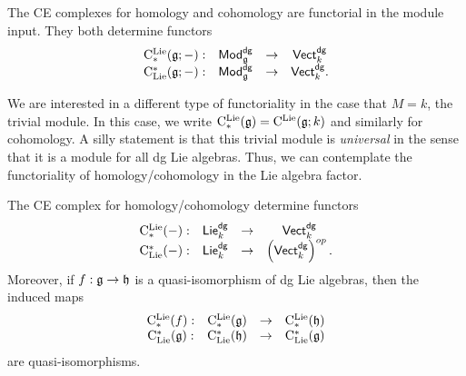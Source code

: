 \documentclass[11pt]{amsart}
\def\dgVect{{\sf Vect}^{\sf dg}}
\def\dgLie{{\sf Lie}^{\sf dg}}
\def\dgMod{{\sf Mod}^{\sf dg}}
\begin{document}
\subsubsection{}

The CE complexes for homology and cohomology are functorial in the module input.
They both determine functors
\[
\begin{array}{cccc}
\clieu_*(\fg ; -) : & \dgMod_\fg & \to & \dgVect_k\\
\clie^*(\fg ; -) : & \dgMod_{\fg} & \to & \dgVect_k .
\end{array}
\]

We are interested in a different type of functoriality in the case that $M = k$, the trivial module. 
In this case, we write ${\rm C}^{\rm Lie}_*(\mathfrak g) = {\rm C}^{\rm Lie}(\mathfrak g;k)$ and similarly for cohomology.
A silly statement is that this trivial module is {\em universal} in the sense that it is a module for all dg Lie algebras.
Thus, we can contemplate the functoriality of homology/cohomology in the Lie algebra factor. 

\begin{lem}
The CE complex for homology/cohomology determine functors
\[
\begin{array}{cccc}
\clieu_*(-) : & \dgLie_k & \to & \dgVect_k\\
\clie^*(-) : & \dgLie_k & \to & \left(\dgVect_k\right)^{op} .
\end{array}
\]
Moreover, if $f : \mathfrak g \to \mathfrak h$ is a quasi-isomorphism of dg Lie algebras, then the induced maps
\[
\begin{array}{cccc}
{\rm C}^{\rm Lie}_*(f) : & {\rm C}^{\rm Lie}_*(\mathfrak g) & \to & {\rm C}^{\rm Lie}_*(\mathfrak h)\\
{\rm C}_{{\rm Lie}}^*(\mathfrak g) : & {\rm C}_{{\rm Lie}}^*(\mathfrak h) & \to & {\rm C}_{{\rm Lie}}^*(\mathfrak g) 
\end{array}
\]
are quasi-isomorphisms. 
\end{lem}
\end{document}

